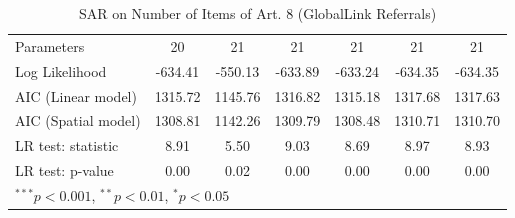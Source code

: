 \begin{table}[!h]
\begin{center}
\begin{tabular}{l c c c c c c }
Parameters              & 20           & 21           & 21           & 21           & 21           & 21           \\
Log Likelihood          & -634.41      & -550.13      & -633.89      & -633.24      & -634.35      & -634.35      \\
AIC (Linear model)      & 1315.72      & 1145.76      & 1316.82      & 1315.18      & 1317.68      & 1317.63      \\
AIC (Spatial model)     & 1308.81      & 1142.26      & 1309.79      & 1308.48      & 1310.71      & 1310.70      \\
LR test: statistic      & 8.91         & 5.50         & 9.03         & 8.69         & 8.97         & 8.93         \\
LR test: p-value        & 0.00         & 0.02         & 0.00         & 0.00         & 0.00         & 0.00         \\
\bottomrule
\multicolumn{7}{l}{\scriptsize{$^{***}p<0.001$, $^{**}p<0.01$, $^*p<0.05$}}
\end{tabular}
\caption{SAR on Number of Items of Art. 8 (GlobalLink Referrals)}
\label{table:coefficients}
\end{center}
\end{table}
